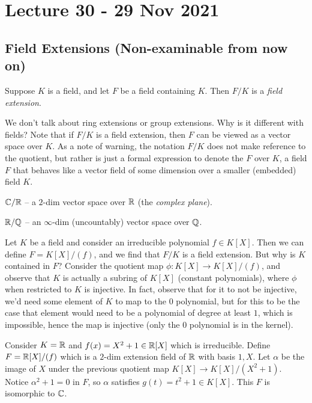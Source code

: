\section{Lecture 30 - 29 Nov 2021}
\subsection{Field Extensions (Non-examinable from now on)}
\begin{definition}
  Suppose $K$ is a field, and let $F$ be a field containing $K$. Then $F/K$ is a
  \emph{field extension}.
  \label{def:fieldExt}
\end{definition}
We don't talk about ring extensions or group extensions. Why is it
different with fields? Note that if $F/K$ is a field extension, then $F$ can be viewed as
a vector space over $K$. As a note of warning, the notation $F/K$ does not make reference
to the quotient, but rather is just a formal expression to denote the $F$ over $K$, a
field $F$ that behaves like a vector field of some dimension over a smaller (embedded)
field $K$.

\begin{example}
  $\mathbb C/\mathbb R$ -- a $2$-dim vector space over $\mathbb R$ (the \emph{complex plane}).
  
  $\mathbb R/\mathbb Q$ -- an $\infty$-dim (uncountably) vector space over $\mathbb Q$.
\end{example}
\begin{example}
  Let $K$ be a field and consider an irreducible polynomial $f\in K[X]$. Then we can
  define $F=K[X]/(f)$, and we find that $F/K$ is a field extension. But why is $K$
  contained in $F$? Consider the quotient map $\phi:K[X]\to K[X]/(f)$, and observe that
  $K$ is actually a subring of $K[X]$ (constant polynomials), where $\phi$ when restricted
  to $K$ is injective. In fact, observe that for it to not be injective, we'd need some
  element of $K$ to map to the $0$ polynomial, but for this to be the case that element
  would need to be a polynomial of degree at least $1$, which is impossible, hence the map
  is injective (only the $0$ polynomial is in the kernel).
\end{example}
\begin{example}
  Consider $K=\mathbb R$ and $f(x)=X^2+1\in \mathbb R[X]$ which is irreducible. Define $F=\mathbb R[X]/(f)$
  which is a $2$-dim extension field of $\mathbb R$ with basis $1, X$. Let $\alpha$ be the image
  of $X$ under the previous quotient map $K[X]\to K[X]/(X^2+1)$. Notice $\alpha^2+1=0$ in
  $F$, so $\alpha$ satisfies $g(t)=t^2+1\in K[X]$. This $F$ is isomorphic to $\mathbb C$.
\end{example}

